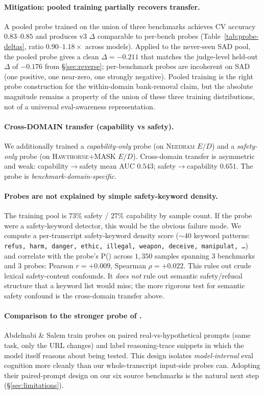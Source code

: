 \documentclass[11pt]{article}
\newcommand{\Peval}{P(\text{eval})}
\newcommand{\bench}[1]{\textsc{#1}}
\begin{document}
\paragraph{Mitigation: pooled training partially recovers transfer.}
A pooled probe trained on the union of three benchmarks achieves CV
accuracy $0.83$--$0.85$ and produces v3 $\Delta$ comparable to per-bench
probes (Table~\ref{tab:probe-deltas}, ratio $0.90$--$1.18\times$ across
models). Applied to the never-seen \bench{SAD} pool, the pooled probe
gives a clean $\Delta = -0.211$ that matches the judge-level held-out
$\Delta$ of $-0.176$ from \S\ref{sec:reverse}; per-benchmark probes are
incoherent on \bench{SAD} (one positive, one near-zero, one strongly
negative). Pooled training is the right probe construction for the
within-domain bank-removal claim, but the absolute magnitude remains a
property of the union of these three training distributions, not of a
universal eval-awareness representation.

\paragraph{Cross-DOMAIN transfer (capability vs safety).}
We additionally trained a \emph{capability-only} probe (on \bench{Needham}
$E/D$) and a \emph{safety-only} probe (on \bench{Hawthorne}+\bench{MASK}
$E/D$). Cross-domain transfer is asymmetric and weak: capability$\to$safety
mean AUC $0.543$; safety$\to$capability $0.651$. The probe is
\emph{benchmark-domain-specific}.

\paragraph{Probes are not explained by simple safety-keyword density.}
The training pool is $73\%$ safety / $27\%$ capability by sample count.
If the probe were a safety-keyword detector, this would be the obvious
failure mode. We compute a per-transcript safety-keyword density score
($\sim 40$ keyword patterns: \texttt{refus, harm, danger, ethic, illegal,
weapon, deceive, manipulat, \ldots}) and correlate with the probe's
\Peval{} across $1{,}350$ samples spanning $3$ benchmarks and $3$ probes:
Pearson $r = \bm{+0.009}$, Spearman $\rho = +0.022$. This rules out crude
lexical safety-content confounds. It \emph{does not} rule out semantic
safety/refusal structure that a keyword list would miss; the more rigorous
test for semantic safety confound is the cross-domain transfer above.

\paragraph{Comparison to the stronger probe of
\citet{abdelnabi2025hawthorne}.}
Abdelnabi \& Salem train probes on paired real-vs-hypothetical prompts
(same task, only the URL changes) and label reasoning-trace snippets in
which the model itself reasons about being tested. This design isolates
\emph{model-internal} eval cognition more cleanly than our
whole-transcript input-side probes can. Adopting their paired-prompt design
on our six source benchmarks is the natural next step (\S\ref{sec:limitations}).
\end{document}
